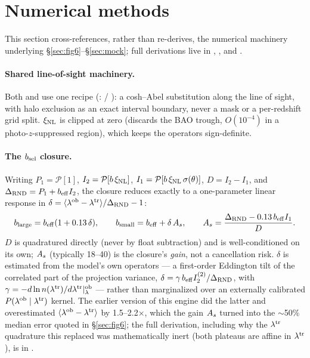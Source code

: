 \section{Numerical methods}
\label{sec:methods}

This section cross-references, rather than re-derives, the numerical
machinery underlying \S\ref{sec:fig6}--\S\ref{sec:mock}; full derivations
live in ,
, and
.

\paragraph{Shared line-of-sight machinery.} Both  and
 use one recipe
(:  /
): a cosh--Abel substitution along the line of
sight, with halo exclusion as an exact interval boundary, never a mask or
a per-redshift grid split. $\xi_{\rm NL}$ is clipped at zero (discards the BAO
trough, $O(10^{-4})$ in a photo-$z$-suppressed region), which keeps the
operators sign-definite.

\paragraph{The $b_{\rm sel}$ closure.} Writing $P_1=\mathcal P[1]$,
$I_2=\mathcal P[b\,\xi_{\rm NL}]$, $I_1=\mathcal P[b\,\xi_{\rm NL}\,\sigma(\theta)]$,
$D=I_2-I_1$, and $\Delta_{\rm RND}=P_1+b_{\rm eff} I_2$, the closure reduces exactly to a
one-parameter linear response in
$\delta=\langle\lambda^{\rm ob}-\lambda^{\rm tr}\rangle/\Delta_{\rm RND}-1$:
\begin{equation}
b_{\rm large} = b_{\rm eff}(1+0.13\,\delta), \qquad
b_{\rm small} = b_{\rm eff} + \delta\,A_s, \qquad
A_s = \frac{\Delta_{\rm RND} - 0.13\,b_{\rm eff} I_1}{D}.
\end{equation}
$D$ is quadratured directly (never by float subtraction) and is
well-conditioned on its own; $A_s$ (typically 18--40) is the closure's
\emph{gain}, not a cancellation risk. $\delta$ is estimated from the
model's own operators --- a first-order Eddington tilt of the correlated
part of the projection variance, $\delta=\gamma\,b_{\rm eff}
I_2^{(2)}/\Delta_{\rm RND}$, with $\gamma=-d\ln n(\lambda^{\rm tr})/d\lambda^{\rm tr}|_\lambda^{\rm ob}$ --- rather than
marginalized over an externally calibrated $P(\lambda^{\rm ob}\mid\lambda^{\rm tr})$ kernel. The
earlier version of this engine did the latter and overestimated
$\langle\lambda^{\rm ob}-\lambda^{\rm tr}\rangle$ by 1.5--2.2$\times$, which the gain $A_s$
turned into the $\sim$50\% median error quoted in \S\ref{sec:fig6}; the
full derivation, including why the $\lambda^{\rm tr}$ quadrature this
replaced was mathematically inert (both plateaus are affine in
$\lambda^{\rm tr}$), is in
.

